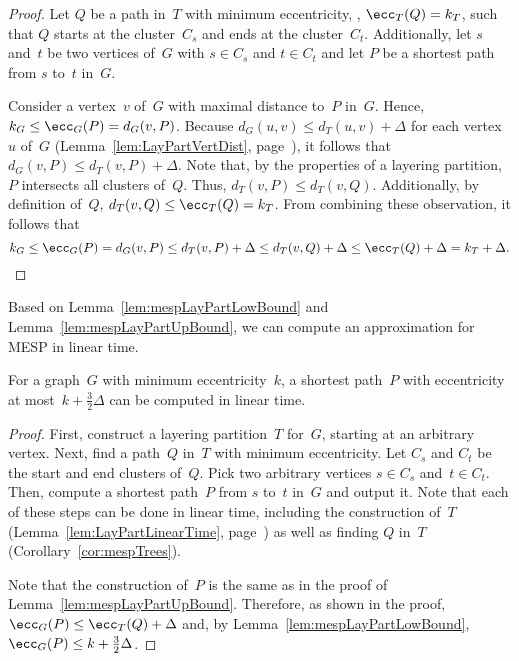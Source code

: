 \begin{proof}
Let $Q$ be a path in~$T$ with minimum eccentricity, \ie, $\ecc_T(Q) = k_T$, such that $Q$ starts at the cluster~$C_s$ and ends at the cluster~$C_t$.
Additionally, let $s$ and~$t$ be two vertices of~$G$ with $s \in C_s$ and $t \in C_t$ and let $P$ be a shortest path from $s$ to~$t$ in~$G$.

Consider a vertex~$v$ of~$G$ with maximal distance to~$P$ in~$G$.
Hence, $k_G \leq \ecc_G(P) = d_G(v, P)$.
Because $d_G(u, v) \leq d_T(u, v) + \Delta$ for each vertex~$u$ of~$G$ (Lemma~\ref{lem:LayPartVertDist}, page~\pageref{lem:LayPartVertDist}), it follows that $d_G(v, P) \leq d_T(v, P) + \Delta$.
Note that, by the properties of a layering partition, $P$ intersects all clusters of~$Q$.
Thus, $d_T(v, P) \leq d_T(v, Q)$.
Additionally, by definition of~$Q$, $d_T(v, Q) \leq \ecc_T(Q) = k_T$.
From combining these observation, it follows that
\[
    k_G \leq \ecc_G(P) = d_G(v, P) \leq d_T(v, P) + \Delta \leq d_T(v, Q) + \Delta \leq \ecc_T(Q) + \Delta = k_T + \Delta.
    \qedhere
\]
\end{proof}

Based on Lemma~\ref{lem:mespLayPartLowBound} and Lemma~\ref{lem:mespLayPartUpBound}, we can compute an approximation for MESP in linear time.

\begin{theorem}
For a graph~\( G \) with minimum eccentricity~\( k \), a shortest path~\( P \) with eccentricity at most~\( k + \frac{3}{2} \Delta \) can be computed in linear time.
\end{theorem}

\begin{proof}
First, construct a layering partition~$T$ for~$G$, starting at an arbitrary vertex.
Next, find a path~$Q$ in~$T$ with minimum eccentricity.
Let $C_s$ and $C_t$ be the start and end clusters of~$Q$.
Pick two arbitrary vertices $s \in C_s$ and~$t \in C_t$.
Then, compute a shortest path~$P$ from $s$ to~$t$ in~$G$ and output it.
Note that each of these steps can be done in linear time, including the construction of~$T$ (Lemma~\ref{lem:LayPartLinearTime}, page~\pageref{lem:LayPartLinearTime}) as well as finding $Q$ in~$T$ (Corollary~\ref{cor:mespTrees}).

Note that the construction of~$P$ is the same as in the proof of Lemma~\ref{lem:mespLayPartUpBound}.
Therefore, as shown in the proof, $\ecc_G(P) \leq \ecc_T(Q) + \Delta$ and, by Lemma~\ref{lem:mespLayPartLowBound}, $\ecc_G(P) \leq k + \frac{3}{2} \Delta$.
\end{proof}



